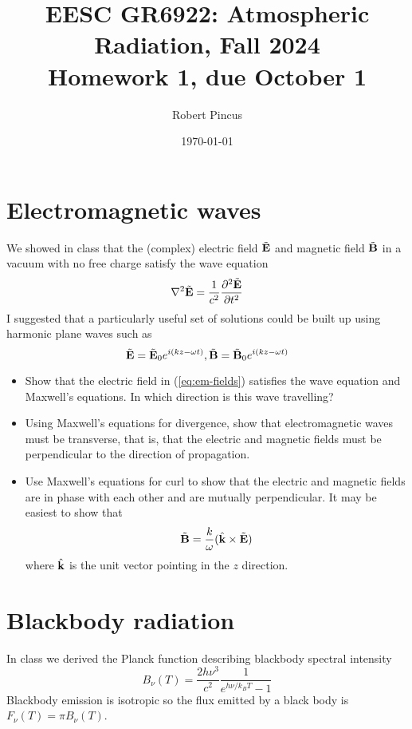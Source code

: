 \documentclass{article}
\title{EESC GR6922: Atmospheric Radiation, Fall 2024 \\ Homework 1, due October 1 }
\author{Robert Pincus}
\date{\today}
\begin{document}
\maketitle
\section{Electromagnetic waves}
We showed in class that the (complex) electric field $\tilde{\bf E}$ and magnetic field $\tilde{\bf B}$ in a vacuum with no free charge satisfy the wave equation
\begin{equation} \label{eq:wave-eq}
\nabla^2  \tilde{\bf E} = \frac{1}{c^2}\frac{\partial^2 \tilde{\bf E} }{\partial t^2}
\end{equation}
I suggested that a particularly useful set of solutions could be built up using harmonic plane waves such as
\begin{equation} \label{eq:em-fields} 
\tilde{\bf E} = \tilde{\bf E}_0 e^{i(k z - \omega t)}, \tilde{\bf B} = \tilde{\bf B}_0 e^{i(k z - \omega t)}
\end{equation} 

\begin{itemize} 
\item Show that the electric field in (\ref{eq:em-fields}) satisfies the wave equation and Maxwell's equations. In which direction is this wave travelling?
\item Using Maxwell’s equations for divergence, show that electromagnetic waves must be transverse, that is, that the electric and magnetic fields must be perpendicular to the direction of propagation.
\item Use Maxwell’s equations for curl to show that the electric and magnetic fields are in phase with each other and are mutually perpendicular. It may be easiest to show that
\begin{equation*}
\tilde{\bf B} =  \frac{k}{\omega} (\hat{\bf k} \times \tilde{\bf E})
\end{equation*}
where $\hat{\bf k}$ is the unit vector pointing in the $z$ direction. 
\end {itemize} 

\section{Blackbody radiation}

In class we derived the Planck function describing blackbody spectral intensity
\begin{equation}\label{eq:Planck-function}
 B_{\nu}(T) = \frac{2 h \nu^3}{c^2} \frac{1}{e^{h \nu/{k_B T}} - 1} 
\end{equation} 
Blackbody emission is isotropic so the flux emitted by a black body is $F_{\nu}(T) = \pi B_{\nu}(T)$.
\end{document}
